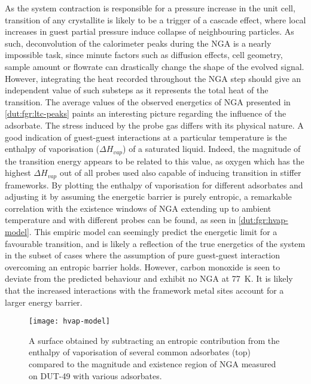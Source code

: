 As the system contraction is responsible for a pressure increase
in the unit cell, transition of any crystallite is likely to be a
trigger of a cascade effect, where local increases in guest partial 
pressure induce collapse of neighbouring particles. As such,
deconvolution of the calorimeter peaks during the NGA is a nearly 
impossible task, since minute factors such as diffusion effects,
cell geometry, sample amount or flowrate can drastically change 
the shape of the evolved signal. However, integrating the heat 
recorded throughout the NGA step should give an independent value of such
substeps as it represents the total heat of the transition. 
The average values of the observed energetics of 
NGA presented in \autoref{dut:fgr:ltc-peaks} paints an interesting
picture regarding the influence of the adsorbate.
The stress induced by the probe gas differs with its physical
nature. A good indication of guest-guest interactions at 
a particular temperature is the enthalpy of vaporisation 
(\(\Delta H_{vap}\)) of a saturated liquid. Indeed, the magnitude
of the transition energy appears to be related to this value, as
oxygen which has the highest \(\Delta H_{vap}\) out of all probes 
used also capable of inducing transition in stiffer frameworks. By
plotting the enthalpy of vaporisation for different adsorbates
and adjusting it by assuming the energetic barrier is purely 
entropic, a remarkable correlation with the existence windows
of NGA extending up to ambient temperature and with different probes
can be found, as seen in \autoref{dut:fgr:hvap-model}.
This empiric model can seemingly predict the energetic limit
for a favourable transition, and is likely a reflection of the 
true energetics of the system in the subset of cases where the 
assumption of pure guest-guest interaction overcoming an entropic
barrier holds. However, carbon monoxide is seen to deviate from
the predicted behaviour and exhibit no NGA at \SI{77}{\kelvin}. 
It is likely that the increased interactions with the framework metal
sites account for a larger energy barrier.

\begin{figure}[htb]
    \centering
    \texttt{[image: hvap-model]}%
    \caption{A surface obtained by subtracting an entropic 
    contribution from the enthalpy of vaporisation of 
    several common adsorbates (top) compared to the 
    magnitude and existence region of NGA measured on 
    DUT-49 with various adsorbates.}%
    \label{dut:fgr:hvap-model}
\end{figure}

